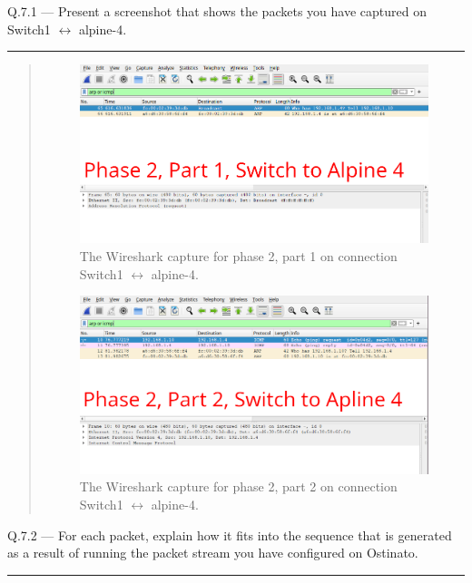 \documentclass{article}
\newcommand\Que[2]{%
\begin{samepage}
\leavevmode\par
\noindent
Q.#1 --- #2\par\vspace{10pt}\hrule\vspace{10pt}
\end{samepage}}
\newenvironment{ans}
{\fbox{Answer}\begin{quote}\nopagebreak}
{\end{quote}}
\begin{document}
\newpage

\Que{7.1}{Present a screenshot that shows the packets you have
captured on Switch1 $\leftrightarrow$ alpine-4.}

\begin{ans}
\begin{figure}[H]
\centering
\includegraphics[width=14cm]{data/q6-phase2-switch-to-alpine4-part1.png}
\caption{The Wireshark capture for phase 2, part 1 on connection Switch1 $\leftrightarrow$ alpine-4.}
\label{fig:wireshark-phase2-part1-for-q6-conn2}
\end{figure}

\begin{figure}[H]
\centering
\includegraphics[width=14cm]{data/q6-phase2-switch-to-alpine4-part2.png}
\caption{The Wireshark capture for phase 2, part 2 on connection Switch1 $\leftrightarrow$ alpine-4.}
\label{fig:wireshark-phase2-part2-for-q6-conn2}
\end{figure}
\end{ans}

\Que{7.2}{For each packet, explain how it fits into the sequence
that is generated as a result of running the packet stream you
have configured on Ostinato.}
\end{document}
